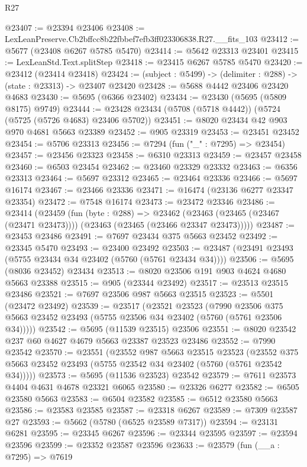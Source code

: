 \begin{lexlean}{R27}
\begin{coremodule}
@23407 := @23394 @23406
@23408 := LexLeanPreserve.Cb2bffcc8b22fbbef7efb3ff023306838.R27.__fits_103
@23412 := @5677 (@23408 @6267 @5785 @5470)
@23414 := @5642 @23313 @23401
@23415 := LexLeanStd.Text.splitStep
@23418 := @23415 @6267 @5785 @5470
@23420 := @23412 (@23414 @23418)
@23424 := (subject : @5499) -> (delimiter : @288) -> (state : @23313) -> @23407 @23420
@23428 := @5688 @4442 @23406 @23420 @4683
@23430 := @5695 (@6366 @23402)
@23434 := @23430 (@5695 (@5809 @8175) @9749)
@23444 := @23428 @23434 (@5708 (@5718 @4442)) (@5724 (@5725 (@5726 @4683) @23406 @5702))
@23451 := @8020 @23434 @42 @903 @970 @4681 @5663 @23389
@23452 := @905 @23319
@23453 := @23451 @23452
@23454 := @5706 @23313
@23456 := @7294 (fun ("_" : @7295) => @23454)
@23457 := @23456 @23323
@23458 := @6310 @23313
@23459 := @23457 @23458
@23460 := @6503 @23454
@23462 := @23460 @23329 @23332
@23463 := @6356 @23313
@23464 := @5697 @23312
@23465 := @23464 @23336
@23466 := @5697 @16174
@23467 := @23466 @23336
@23471 := @16474 (@23136 @6277 @23347 @23354)
@23472 := @7548 @16174
@23473 := @23472 @23346
@23486 := @23414
    (@23459
      (fun (byte : @288) =>
      @23462 (@23463 (@23465 (@23467 (@23471 @23473)))) (@23463 (@23465 (@23466 @23347 @23473)))))
@23487 := @23453 @23486
@23491 := @7697 @23434 @375 @5663 @23452
@23492 := @23345 @5470
@23493 := @23400 @23492
@23503 := @23487 (@23491 @23493 (@5755 @23434 @34 @23402 (@5760 (@5761 @23434 @34))))
@23506 := @5695 (@8036 @23452) @23434
@23513 := @8020 @23506 @191 @903 @4624 @4680 @5663 @23388
@23515 := @905 (@23344 @23492)
@23517 := @23513 @23515 @23486
@23521 := @7697 @23506 @987 @5663 @23515
@23523 := @5501 (@23472 @23492)
@23539 := @23517
    (@23521
      @23523
      (@7990 @23506 @375 @5663 @23452 @23493 (@5755 @23506 @34 @23402 (@5760 (@5761 @23506 @34)))))
@23542 := @5695 (@11539 @23515) @23506
@23551 := @8020 @23542 @237 @60 @4627 @4679 @5663 @23387 @23523 @23486
@23552 := @7990 @23542
@23570 := @23551
    (@23552
      @987
      @5663
      @23515
      @23523
      (@23552 @375 @5663 @23452 @23493 (@5755 @23542 @34 @23402 (@5760 (@5761 @23542 @34)))))
@23573 := @5695 (@11536 @23523) @23542
@23579 := @7611 @23573 @4404 @4631 @4678 @23321 @6065
@23580 := @23326 @6277
@23582 := @6505 @23580 @5663
@23583 := @6504 @23582
@23585 := @6512 @23580 @5663
@23586 := @23583 @23585
@23587 := @23318 @6267
@23589 := @7309 @23587 @27
@23593 := @5662 (@5780 (@6525 @23589 @7317))
@23594 := @23131 @6281
@23595 := @23345 @6267
@23596 := @23344 @23595
@23597 := @23594 @23596
@23599 := @23352 @23587 @23596
@23633 := @23579
    (fun (__a : @7295) =>
    @7619

\end{coremodule}
\end{lexlean}
